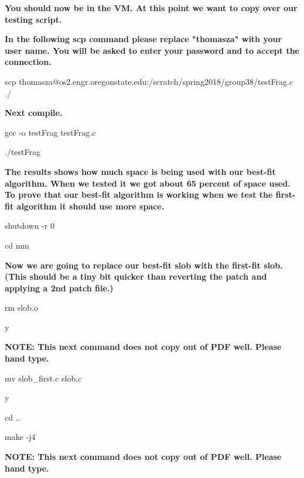 \documentclass[journal,10pt,onecolumn,letterpaper,draftclsnofoot]{IEEEtran}
\begin{document}
\textbf{You should now be in the VM. At this point we want to copy over our testing script.\newline}

\textbf{In the following scp command please replace "thomasza" with your user name. You will be asked to enter your password and to accept the connection.\newline}

scp thomasza@os2.engr.oregonstate.edu:/scratch/spring2018/group38/testFrag.c ./\newline

\textbf{Next compile.\newline}

gcc -o testFrag testFrag.c\newline

./testFrag\newline

\textbf{The results shows how much space is being used with our best-fit algorithm.
When we tested it we got about 65 percent of space used. To prove that our
best-fit algorithm is working when we test the first-fit algorithm it should use more space.\newline}

shutdown -r 0\newline

cd mm\newline

\textbf{Now we are going to replace our best-fit slob with the first-fit slob. (This should be a tiny bit quicker than reverting the patch and applying a 2nd patch file.)\newline}

rm slob.o\newline

y\newline

\textbf{NOTE: This next command does not copy out of PDF well. Please hand type.\newline}

mv slob\_first.c slob.c\newline

y\newline

cd ..\newline

make -j4\newline

\textbf{NOTE: This next command does not copy out of PDF well. Please hand type.\newline}
\end{document}

